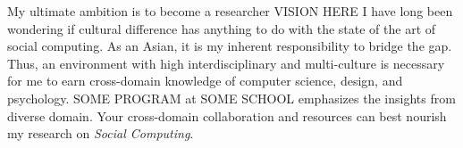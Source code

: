 %
\noindent
My ultimate ambition is to become a researcher VISION HERE
I have long been wondering if cultural difference has anything to do with the state of the art of social computing. 
As an Asian, it is my inherent responsibility to bridge the gap.
Thus, an environment with high interdisciplinary and multi-culture is necessary
for me to earn cross-domain knowledge of computer science, design, and psychology.
SOME PROGRAM at SOME SCHOOL emphasizes the insights from diverse domain. 
Your cross-domain collaboration and resources can best nourish my research on \textit{Social Computing}.


